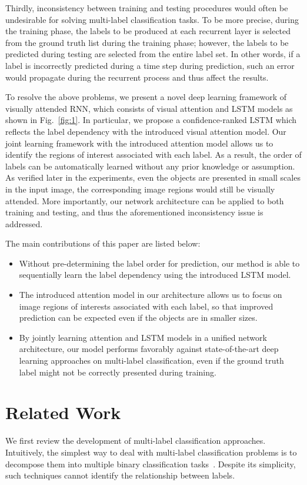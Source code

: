 \documentclass[letterpaper]{article} %
\begin{document}
Thirdly, inconsistency between training and testing procedures would often be undesirable for solving multi-label classification tasks. To be more precise, during the training phase, the labels to be produced at each recurrent layer is selected from the ground truth list during the training phase; however, the labels to be predicted during testing are selected from the entire label set. In other words, if a label is incorrectly predicted during a time step during prediction, such an error would propagate during the recurrent process and thus affect the results.

To resolve the above problems, we present a novel deep learning framework of visually attended RNN, which consists of visual attention and LSTM models as shown in Fig.~\ref{fig:1}. In particular, we propose a confidence-ranked LSTM which reflects the label dependency with the introduced visual attention model. Our joint learning framework with the introduced attention model allows us to identify the regions of interest associated with each label. As a result, the order of labels can be automatically learned without any prior knowledge or assumption. As verified later in the experiments, even the objects are presented in small scales in the input image, the corresponding image regions would still be visually attended. More importantly, our network architecture can be applied to both training and testing, and thus the aforementioned inconsistency issue is addressed.


The main contributions of this paper are listed below: %
\begin{itemize}
	\item Without pre-determining the label order for prediction, our method is able to sequentially learn the label dependency using the introduced LSTM model.
	\item The introduced attention model in our architecture allows us to focus on image regions of interests associated with each label, so that improved prediction can be expected even if the objects are in smaller sizes.
	\item By jointly learning attention and LSTM models in a unified network architecture, our model performs favorably against state-of-the-art deep learning approaches on multi-label classification, even if the ground truth label might not be correctly presented during training.
\end{itemize}


\section{Related Work}
\label{sec:rewo}
We first review the development of multi-label classification approaches. Intuitively, the simplest way to deal with multi-label classification problems is to decompose them into multiple binary classification tasks~\cite{tsoumakas2006multi}. Despite its simplicity, such techniques cannot identify the relationship between labels.
\end{document}
